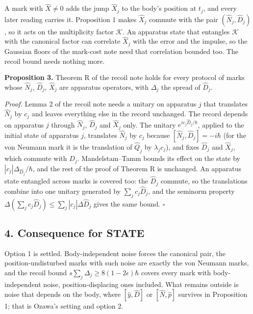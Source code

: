 \documentclass[11pt,a4paper]{article}
\begin{document}
A mark with \(\hat X\ne0\) adds the jump \(\hat X_j\) to the body's
position at \(t_j\), and every later reading carries it. Proposition 1
makes \(\hat X_j\) commute with the pair \((\hat N_j,\hat D_j)\), so it
acts on the multiplicity factor \(\mathcal K\). An apparatus state that
entangles \(\mathcal K\) with the canonical factor can correlate
\(\hat X_j\) with the error and the impulse, so the Gaussian floors of
the mark-cost note need that correlation bounded too. The recoil bound
needs nothing more.

\textbf{Proposition 3.} Theorem R of the recoil note holds for every
protocol of marks whose \(\hat N_j\), \(\hat D_j\), \(\hat X_j\) are
apparatus operators, with \(\Delta_j\) the spread of \(\hat D_j\).

\emph{Proof.} Lemma 2 of the recoil note needs a unitary on apparatus
\(j\) that translates \(\hat N_j\) by \(c_j\) and leaves everything else
in the record unchanged. The record depends on apparatus \(j\) through
\(\hat N_j\), \(\hat D_j\) and \(\hat X_j\) only. The unitary
\(e^{ic_j\hat D_j/\hbar}\), applied to the initial state of apparatus
\(j\), translates \(\hat N_j\) by \(c_j\) because
\([\hat N_j,\hat D_j]=-i\hbar\) (for the von Neumann mark it is the
translation of \(\hat Q_j\) by \(\lambda_jc_j\)), and fixes \(\hat D_j\)
and \(\hat X_j\), which commute with \(\hat D_j\). Mandelstam--Tamm
bounds its effect on the state by \(|c_j|\Delta_{\hat D_j}/\hbar\), and
the rest of the proof of Theorem R is unchanged. An apparatus state
entangled across marks is covered too: the \(\hat D_j\) commute, so the
translations combine into one unitary generated by
\(\sum_jc_j\hat D_j\), and the seminorm property
\(\Delta(\sum_jc_j\hat D_j)\le\sum_j|c_j|\Delta\hat D_j\) gives the same
bound. \(\square\)

\hypertarget{consequence-for-state}{%
\subsection{4. Consequence for STATE}\label{consequence-for-state}}

Option 1 is settled. Body-independent noise forces the canonical pair,
the position-undisturbed marks with such noise are exactly the von
Neumann marks, and the recoil bound
\(s\sum_j\Delta_j\ge8(1-2\epsilon)\hbar\) covers every mark with
body-independent noise, position-displacing ones included. What remains
outside is noise that depends on the body, where \([\hat y,\hat D]\) or
\([\hat N,\hat p]\) survives in Proposition 1; that is Ozawa's setting
and option 2.
\end{document}
